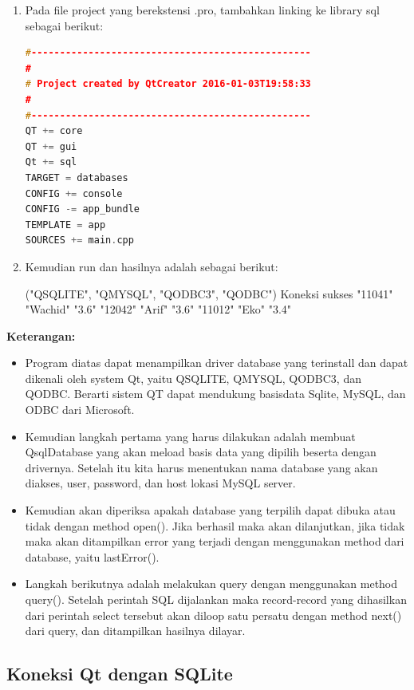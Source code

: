 \begin{enumerate}
\item
Pada file project yang berekstensi .pro, tambahkan linking ke library
sql sebagai berikut:

\begin{lstlisting}[language=c++]
#-------------------------------------------------
#
# Project created by QtCreator 2016-01-03T19:58:33
#
#-------------------------------------------------
QT += core
QT += gui
Qt += sql
TARGET = databases
CONFIG += console
CONFIG -= app_bundle
TEMPLATE = app
SOURCES += main.cpp
\end{lstlisting}
\item
Kemudian run dan hasilnya adalah sebagai berikut:

\begin{lcverbatim}
("QSQLITE", "QMYSQL", "QODBC3", "QODBC")
Koneksi sukses
"11041"
"Wachid"
"3.6"
"12042"
"Arif"
"3.6"
"11012"
"Eko"
"3.4"
\end{lcverbatim}
\end{enumerate}

\textbf{Keterangan:}

\begin{itemize}

\item
Program diatas dapat menampilkan driver database yang terinstall dan
dapat dikenali oleh system Qt, yaitu QSQLITE, QMYSQL, QODBC3, dan
QODBC. Berarti sistem QT dapat mendukung basisdata Sqlite, MySQL, dan
ODBC dari Microsoft.
\item
Kemudian langkah pertama yang harus dilakukan adalah membuat
QsqlDatabase yang akan meload basis data yang dipilih beserta dengan
drivernya. Setelah itu kita harus menentukan nama database yang akan
diakses, user, password, dan host lokasi MySQL server.
\item
Kemudian akan diperiksa apakah database yang terpilih dapat dibuka
atau tidak dengan method open(). Jika berhasil maka akan dilanjutkan,
jika tidak maka akan ditampilkan error yang terjadi dengan menggunakan
method dari database, yaitu lastError().
\item
Langkah berikutnya adalah melakukan query dengan menggunakan method
query(). Setelah perintah SQL dijalankan maka record-record yang
dihasilkan dari perintah select tersebut akan diloop satu persatu
dengan method next() dari query, dan ditampilkan hasilnya dilayar.
\end{itemize}

\subsection{Koneksi Qt dengan SQLite}\label{koneksi-qt-dengan-sqlite}

